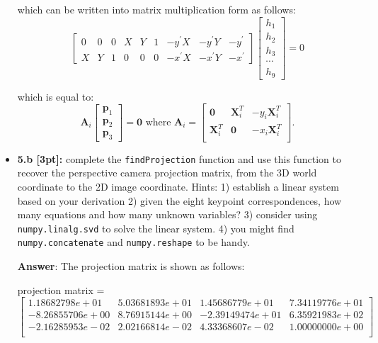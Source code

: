\documentclass[11pt]{article}
\begin{document}
\begin{itemize}
which can be written into matrix multiplication form as follows:
\[
\left[\begin{array}{ccccccccc}
    0 & 0 & 0 & X & Y & 1 & -y^{\prime} X & -y^{\prime} Y & -y^{\prime} \\
    X & Y & 1 & 0 & 0 & 0 & -x^{\prime} X & -x^{\prime} Y & -x^{\prime}
    \end{array}\right]\left[\begin{array}{c}
    h_{1} \\
    h_{2} \\
    h_{3} \\
    \cdots \\
    h_{9}
\end{array}\right]=0    
\]

which is equal to:
\[
\mathbf{A}_i 
\left[
\begin{array}{c}
\mathbf{p}_1 \\
\mathbf{p}_2 \\
\mathbf{p}_3
\end{array}
\right] = \mathbf{0} \textrm{\ where \ } \mathbf{A}_i = \left[
\begin{array}{ccc}
\mathbf{0} & \mathbf{X}_i^T & - y_i \mathbf{X}_i^T \\
\mathbf{X}_i^T & \mathbf{0} & - x_i \mathbf{X}_i^T \\
\end{array}
\right].
\]


\item \textbf{5.b [3pt]:} complete the \texttt{findProjection} function and use this function to recover the perspective camera projection matrix, from the 3D world coordinate to the 2D image coordinate. Hints: 1) establish a linear system based on your derivation 2) given the eight keypoint correspondences, how many equations and how many unknown variables? 3) consider using \texttt{numpy.linalg.svd} to solve the linear system. 4) you might find \texttt{numpy.concatenate} and \texttt{numpy.reshape} to be handy.  

\textbf{Answer}: The projection matrix is shown as follows:

projection matrix = 
\[
\left[
\begin{array}{cccc}
    1.18682798e+01 & 5.03681893e+01 & 1.45686779e+01 & 7.34119776e+01 \\
    -8.26855706e+00 & 8.76915144e+00 & -2.39149474e+01 & 6.35921983e+02 \\ 
    -2.16285953e-02 & 2.02166814e-02 & 4.33368607e-02 & 1.00000000e+00 \\
\end{array}
\right]
\]


\end{itemize}
\end{document}

